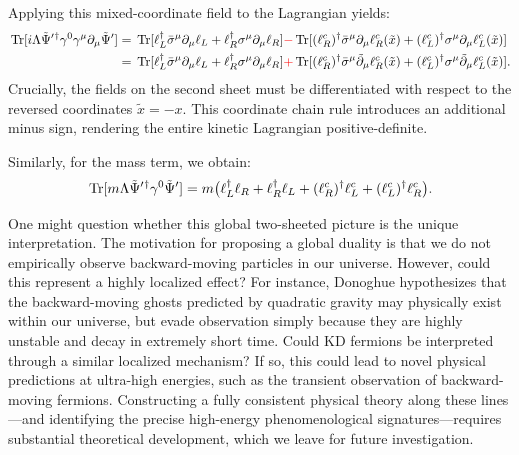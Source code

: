 Applying this mixed-coordinate field to the Lagrangian yields: 
\begin{equation}
\begin{aligned}
    \,{\rm Tr}[i\Lambda\tilde\Psi'{}^{\dagger}\gamma^{0}\gamma^\mu\partial_\mu\tilde \Psi']&=\,{\rm Tr}[\ell_L^\dagger \bar{\sigma}^\mu\partial_\mu\ell_L+\ell_R^\dagger \sigma^\mu\partial_\mu\ell_R]\textcolor{red}{-}\,{\rm Tr}[(\ell_R^c)^\dagger \bar{\sigma}^\mu\partial_\mu\ell_R^c(\tilde x)+(\ell_L^c)^\dagger \sigma^\mu\partial_\mu\ell_L^c(\tilde x)]\\
    &=\,{\rm Tr}[\ell_L^\dagger \bar{\sigma}^\mu\partial_\mu\ell_L+\ell_R^\dagger \sigma^\mu\partial_\mu\ell_R]\textcolor{red}{+}\,{\rm Tr}[(\ell_R^c)^\dagger \bar{\sigma}^\mu\tilde\partial_\mu\ell_R^c(\tilde x)+(\ell_L^c)^\dagger \sigma^\mu\tilde\partial_\mu\ell_L^c(\tilde x)].
\end{aligned}
\end{equation}
Crucially, the fields on the second sheet must be differentiated with respect to the reversed coordinates $\tilde x=-x$. This coordinate chain rule introduces an additional minus sign, rendering the entire kinetic Lagrangian positive-definite. 

Similarly, for the mass term, we obtain:
\begin{equation}
\begin{aligned}
    \,{\rm Tr}[m\Lambda\tilde\Psi'{}^{\dagger}\gamma^{0}\tilde \Psi']=m\big(\ell_L^\dagger\ell_R+\ell_R^\dagger\ell_L+(\ell_R^c)^\dagger\ell_L^c+(\ell_L^c)^\dagger\ell_R^c\big).
\end{aligned}
\end{equation}

One might question whether this global two-sheeted picture is the unique interpretation. The motivation for proposing a global duality is that we do not empirically observe backward-moving particles in our universe. However, could this represent a highly localized effect? For instance, Donoghue \cite{Donoghue:2019ecz} hypothesizes that the backward-moving ghosts predicted by quadratic gravity may physically exist within our universe, but evade observation simply because they are highly unstable and decay in extremely short time. Could KD fermions be interpreted through a similar localized mechanism? If so, this could lead to novel physical predictions at ultra-high energies, such as the transient observation of backward-moving fermions. Constructing a fully consistent physical theory along these lines—and identifying the precise high-energy phenomenological signatures—requires substantial theoretical development, which we leave for future investigation.


